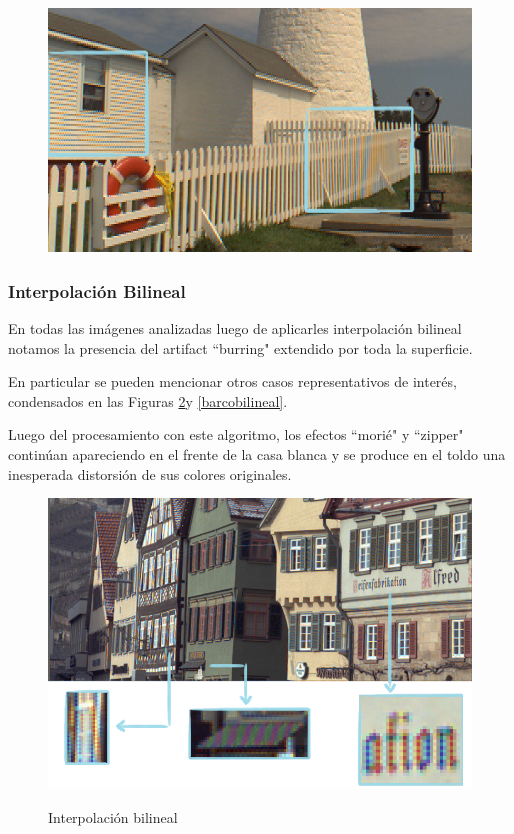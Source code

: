 \documentclass[a4paper]{article}
\begin{document}
\begin{figure}[h!]
	\caption{}
	\begin{center}
	\includegraphics[scale=1]{imagenes/casafarovecino}
	\label{casafarovecino}
  \end{center}
\end{figure}


\subsubsection{Interpolación Bilineal}

En todas las imágenes analizadas luego de aplicarles interpolación bilineal notamos la presencia del artifact ``burring" extendido por toda la superficie.

En particular se pueden mencionar otros casos representativos de interés, condensados en las Figuras \ref{vecinobilineal}y \ref{barcobilineal}.


Luego del procesamiento con este algoritmo, los efectos ``morié" y ``zipper" continúan apareciendo en el frente de la casa blanca y se produce en el toldo una inesperada distorsión de sus colores originales. 

\begin{figure}[h!]
	\caption{Interpolación bilineal}
	\begin{center}
	\includegraphics[scale=0.05]{imagenes/vecinobilineal}
	\label{vecinobilineal}
  \end{center}
\end{figure}
\end{document}
